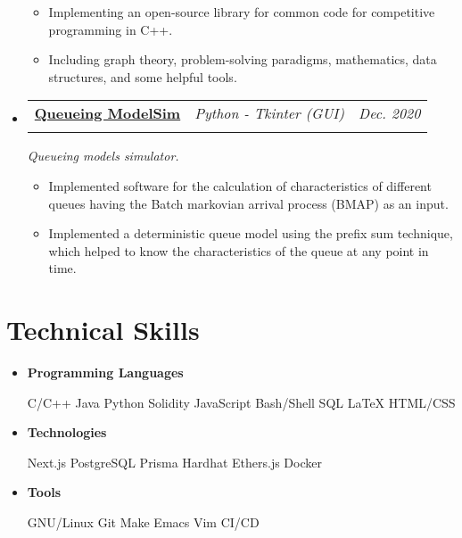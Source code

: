 \documentclass[letterpaper, 11pt]{article}
\makeatletter
\newcommand{\project}[6] {
  \vspace{-1pt}\item
  \begin{tabular*}{0.97\textwidth}[t]{ll@{\extracolsep{\fill}}r}
    #1 \href{#4}{\textbf{\color{RoyalBlue}#2}} \textbar{ } & \textit{#5} & \textit{\small #3} \\
    \vspace{-10pt}
  \end{tabular*}
  \textit{\small #6}
  \vspace{-8pt}
}
\newcommand{\subproject}[1] {
\item\small
  {#1}
  \vspace{-2pt}
}
\newcommand{\technicalskill}[2] {
  \vspace{-1pt}
\item\small
  #1 \textbf{#2}
  \vspace{-2pt}
}
\newcommand{\subtechnicalskill}[1] {
  \vspace{4pt}
  \small
  #1
  \vspace{-4pt}
}
\makeatother
\begin{document}
\begin{itemize}[leftmargin=*]
  \begin{itemize}
    \subproject
    {Implementing an open-source library for common code for competitive programming in C++.}
    \subproject
    {Including graph theory, problem-solving paradigms, mathematics, data structures, and some helpful tools.}
  \end{itemize}\vspace{-4pt}

  \project
  {\faIcon{user-clock}}
  {Queueing ModelSim}{Dec. 2020}
  {https://github.com/AbdeltwabMF/Queueing-ModelSim}{Python - Tkinter (GUI)}
  {Queueing models simulator.}

  \begin{itemize}
    \subproject
    {Implemented software for the calculation of characteristics of different queues having the Batch markovian arrival process (BMAP) as an input.}
    \subproject
    {Implemented a deterministic queue model using the prefix sum technique, which helped to know the characteristics of the queue at any point in time.}
  \end{itemize}\vspace{-4pt}
\end{itemize}

\section{Technical Skills}
\begin{itemize}[leftmargin=*]
  \technicalskill
  {}{Programming Languages}

  \begin{itemize}
    \subtechnicalskill
    {C/C++ \textbar{} Java \textbar{} Python \textbar{} Solidity \textbar{} JavaScript \textbar{} Bash/Shell \textbar{} SQL \textbar{} \LaTeX{} \textbar{} HTML/CSS}
  \end{itemize}\vspace{-4pt}

  \technicalskill
  {}{Technologies}
  \begin{itemize}
    \subtechnicalskill
    {Next.js \textbar{} PostgreSQL \textbar{} Prisma \textbar{} Hardhat \textbar{} Ethers.js \textbar{} Docker}
  \end{itemize}\vspace{-4pt}

  \technicalskill
  {}{Tools}
  \begin{itemize}
    \subtechnicalskill
    {GNU/Linux \textbar{} Git \textbar{} Make \textbar{} Emacs \textbar{} Vim \textbar{} CI/CD}
  \end{itemize}\vspace{-4pt}
\end{itemize}
\end{document}
